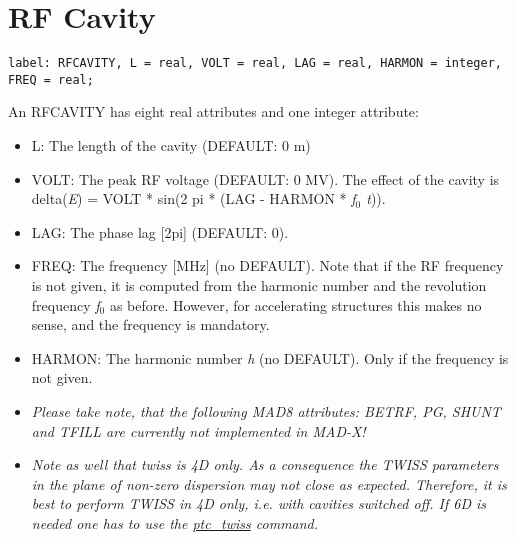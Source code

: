
\section{RF Cavity}


\begin{verbatim}
label: RFCAVITY, L = real, VOLT = real, LAG = real, HARMON = integer, FREQ = real;                  
\end{verbatim} 



An RFCAVITY has eight real attributes and one integer attribute: 
\begin{itemize}
   \item L: The length of the cavity (DEFAULT: 0 m) 
   \item VOLT: The peak RF voltage (DEFAULT: 0 MV). The effect of the cavity is \\
     delta(\textit{E}) = VOLT * sin(2 pi * (LAG - HARMON * \textit{f$_0$ t})). 
   \item LAG: The phase lag [2pi] (DEFAULT: 0). 
   \item FREQ: The frequency [MHz] (no DEFAULT). Note that if the RF
     frequency is not given, it is computed from the harmonic number and
     the revolution frequency \textit{f$_0$} as before. However, for
     accelerating structures this makes no sense, and the frequency is
     mandatory.  
   \item HARMON: The harmonic number \textit{h} (no DEFAULT). Only if
     the frequency is not given.  
   \item \textit{ Please take note, that the following MAD8 attributes:
     BETRF, PG, SHUNT and TFILL are currently not implemented in MAD-X!}    

   \item \textit{ Note as well that twiss is 4D only. As a consequence
     the TWISS parameters in the plane of non-zero dispersion may not
     close as expected. Therefore, it is best to perform TWISS in 4D
     only, i.e. with cavities switched off. If 6D is needed one has to
     use the \href{../ptc_twiss/ptc_twiss.html}{ptc\_twiss} command. } 
\end{itemize}  

